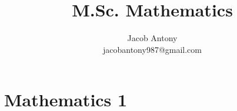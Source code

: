 \documentclass[a4paper,12pt,openany]{book}
\title{M.Sc. Mathematics}
\author{Jacob Antony\\jacobantony987@gmail.com}
\begin{document}
\tableofcontents

\printindex

\part{Mathematics 1}

%

%
%
%
%

%
%
%
%
%
%

%




\end{document}
